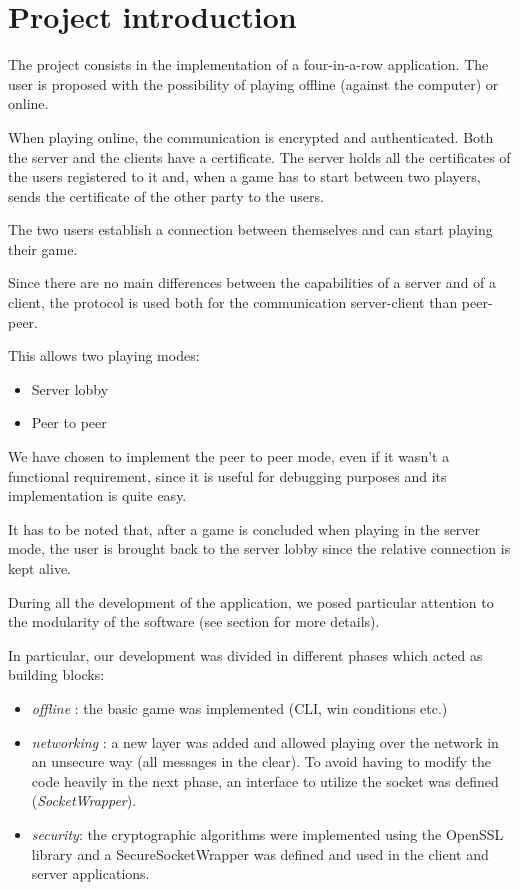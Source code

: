 \section{Project introduction}
The project consists in the implementation of a four-in-a-row application. 
The user is proposed with the possibility of playing offline (against the computer) or online.

When playing online, the communication is encrypted and authenticated.
Both the server and the clients have a certificate. The server holds all the certificates of the users registered to it and, when a game has to start between two players, sends the certificate of the other party to the users.

The two users establish a connection between themselves and can start playing their game.

Since there are no main differences between the capabilities of a server and of a client, the protocol is used both for the communication server-client than peer-peer.

This allows two playing modes:
\begin{itemize}
	\item Server lobby
	\item Peer to peer
\end{itemize}

We have chosen to implement the peer to peer mode, even if it wasn't a functional requirement, since it is useful for debugging purposes and its implementation is quite easy.

It has to be noted that, after a game is concluded when playing in the server mode, the user is brought back to the server lobby since the relative connection is kept alive.

During all the development of the application, we posed particular attention to the modularity of the software (see  section for more details).

In particular, our development was divided in different phases which acted as building blocks:
\begin{itemize}
	\item \textit{offline} : the basic game was implemented (CLI, win conditions etc.)
	\item \textit{networking} : a new layer was added and allowed playing over the network in an unsecure way (all messages in the clear). To avoid having to modify the code heavily in the next phase, an interface to utilize the socket was defined (\textit{SocketWrapper}).
	\item \textit{security}: the cryptographic algorithms were implemented using the OpenSSL library and a SecureSocketWrapper was defined and used in the client and server applications.
\end{itemize}

